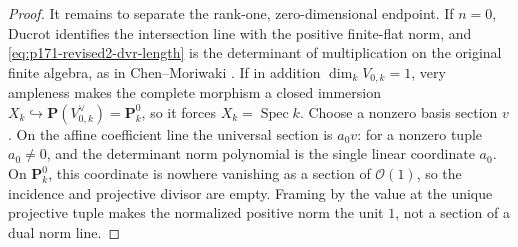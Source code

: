 \begin{proof}
It remains to separate the rank-one, zero-dimensional endpoint.  If
\(n=0\), Ducrot \cite[Proposition~6.1.1(3)]{Ducrot97CubeIntersection}
identifies the intersection line with
the positive finite-flat norm, and
\eqref{eq:p171-revised2-dvr-length} is the determinant of multiplication on
the original finite algebra, as in Chen--Moriwaki
\cite[Example~1.6.4]{ChenMoriwaki21AdelicIntersection}.  If in
addition \(\dim_kV_{0,k}=1\), very ampleness makes the complete morphism a
closed immersion
\(X_k\hookrightarrow\mathbf P(V_{0,k}^\vee)=\mathbf P^0_k\), so it forces
\(X_k=\operatorname{Spec}k\).  Choose a nonzero basis section \(v\).  On
the affine coefficient line the universal section is \(a_0v\): for a
nonzero tuple \(a_0\ne0\), and the determinant norm polynomial is the
single linear coordinate \(a_0\).  On \(\mathbf P^0_k\), this coordinate
is nowhere vanishing as a section of \(\mathcal O(1)\), so the incidence
and projective divisor are empty.  Framing by the value at the unique
projective tuple makes the normalized positive norm the unit \(1\), not a
section of a dual norm line.
\end{proof}


